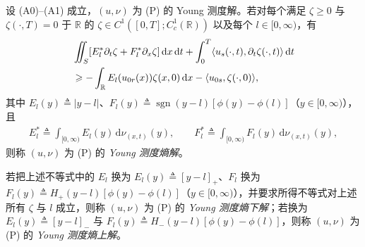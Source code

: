 ﻿\documentclass[../../main.tex]{subfiles}%
\begin{document}
\begin{definition}\label{definition:ch07-young熵解}
设 (A0)--(A1) 成立，$(u,\nu)$ 为 (P) 的 Young 测度解。若对每个满足 $\zeta\geqslant0$ 与 $\zeta(\cdot,T)=0$ 于 $\mathbb{R}$ 的 $\zeta\in C^1([0,T];C_c^1(\mathbb{R}))$ 以及每个 $l\in[0,\infty)$，有
\begin{align}
&\iint_S[E_l^*\partial_t\zeta+F_l^*\partial_x\zeta]\,\mathrm{d}x\,\mathrm{d}t
+\int_0^T\langle u_s(\cdot,t),\partial_t\zeta(\cdot,t)\rangle\,\mathrm{d}t\notag\\
&\geqslant-\int_{\mathbb{R}}E_l(u_{0r}(x))\zeta(x,0)\,\mathrm{d}x-\langle u_{0s},\zeta(\cdot,0)\rangle, \label{align:ch07-7.5}
\end{align}
其中 $E_l(y)\triangleq|y-l|$、$F_l(y)\triangleq\operatorname{sgn}(y-l)[\phi(y)-\phi(l)]$（$y\in[0,\infty)$），且
\begin{align*}
E_l^*\triangleq\int_{[0,\infty)}E_l(y)\,\mathrm{d}\nu_{(x,t)}(y),\qquad
F_l^*\triangleq\int_{[0,\infty)}F_l(y)\,\mathrm{d}\nu_{(x,t)}(y),
\end{align*}
则称 $(u,\nu)$ 为 (P) 的 \emph{Young 测度熵解}。

若把上述不等式中的 $E_l$ 换为 $E_l(y)\triangleq[y-l]_+$、$F_l$ 换为 $F_l(y)\triangleq H_+(y-l)[\phi(y)-\phi(l)]$（$y\in[0,\infty)$），并要求所得不等式对上述所有 $\zeta$ 与 $l$ 成立，则称 $(u,\nu)$ 为 (P) 的 \emph{Young 测度熵下解}；若换为 $E_l(y)\triangleq[y-l]_-$ 与 $F_l(y)\triangleq H_-(y-l)[\phi(y)-\phi(l)]$，则称 $(u,\nu)$ 为 (P) 的 \emph{Young 测度熵上解}。
\end{definition}
\end{document}
